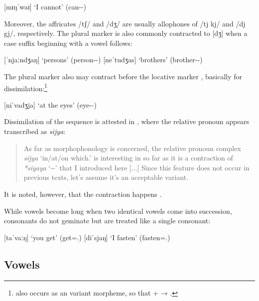 \ex
	 [mɪŋˈwaɪ] `I cannot' (can-\Neg{}-\Fsg{})
\xe

Moreover, the affricates /tʃ/ and /dʒ/ are usually allophones of /tj kj/ and 
/dj gj/, respectively. The plural marker  is also commonly 
contracted to [dʒ] when a case suffix beginning with a vowel follows:

\pex
	\a {} [ˈnjaːndʒaŋ] `persons' (person-\Pl{}-\Aarg{})
	\a {} [neˈtudʒas] `brothers' (brother-\Pl{}-\Parg{})
\xe

The plural marker also may contract before the locative marker , 
basically for dissimilation:\footnote{ also occurs as an 
variant morpheme, so that  +  → 
.}

\ex
	 [niˈvadʒja] `at the eyes' (eye-\Pl{}-\Loc{})
\xe

Dissimilation of the sequence  is attested in 
\citet[12]{becker:kafka:imperial}, where the relative pronoun 
 appears transcribed as \textit{sijya}:

\begin{quote}
As far as morphophonology is concerned, the relative pronoun complex 
\textit{sijya} `in/at/on which.\Loc{}' is interesting in so far as it is a 
contraction of \textit{*siyaya} `\Rel{}-\Loc{}-\Loc{}' that I introduced here
[...] Since this feature does not occur in previous texts, let's assume it's an 
acceptable variant.
\end{quote}

\noindent It is noted, however, that the contraction happens 
.

While vowels become long when two identical vowels come into succession,  
consonants do not geminate but are treated like a single consonant:

\pex
	\a {} [taˈvaːŋ] `you get' (get=\Ssg{}.\Aarg{})
	\a {} [diˈsjaŋ] `I fasten' (fasten=\Fsg{}.\Aarg{})
\xe

\subsection{Vowels}

